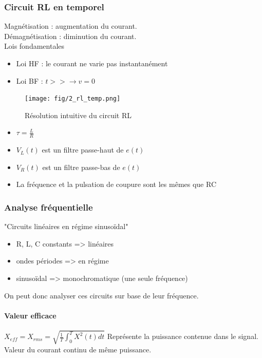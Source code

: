\documentclass[a4paper]{article}
\begin{document}
        \subsubsection{Circuit RL en temporel}
            Magnétisation : augmentation du courant. \\
            Démagnétisation : diminution du courant. \\
            Lois fondamentales
            \begin{itemize}
                \item Loi HF : le courant ne varie pas instantanément
                \item Loi BF : $ t>> \rightarrow v = 0 $
            \end{itemize}
            \begin{figure}[H]
                \begin{center}
                    \texttt{[image: fig/2\_rl\_temp.png]}
                    \caption{Résolution intuitive du circuit RL}
                    \label{fig:2_superposition}
                \end{center}
            \end{figure}
            \begin{itemize}
                \item $ \tau = \frac{L}{R} $
                \item $ V_{L}(t) $ est un filtre passe-haut de $ e(t) $
                \item $ V_{R}(t) $ est un filtre passe-bas de $ e(t) $
                \item La fréquence et la pulsation de coupure sont les mêmes que RC
            \end{itemize}

        \subsubsection{Analyse fréquentielle}
            "Circuits linéaires en régime sinusoïdal"
            \begin{itemize}
                \item R, L, C constants => linéaires
                \item ondes périodes => en régime
                \item sinusoïdal => monochromatique (une seule fréquence)
            \end{itemize}
            On peut donc analyser ces circuits sur base de leur fréquence.
            \paragraph{Valeur efficace}
                $ X_{eff} = X_{rms} = \sqrt{\frac{1}{T}\int_{0}^{T}X^{2}(t)dt} $
                Représente la puissance contenue dans le signal. Valeur du courant continu de même puissance.
\end{document}
